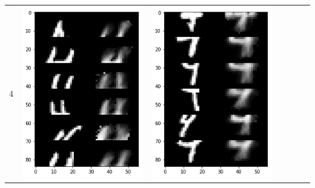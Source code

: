 \documentclass[12pt]{report} %
\begin{document}
\begin{tabular}{m{0.7cm}m{2.4cm}m{2.4cm}m{2.4cm}m{2.4cm}m{2.4cm}m{2.4cm}}
	4 & \includegraphics[scale=0.3]{pictures/KE_4_up.png} & \includegraphics[scale=0.3]{pictures/KE_4_down.png} &

\end{tabular}
\end{document}
